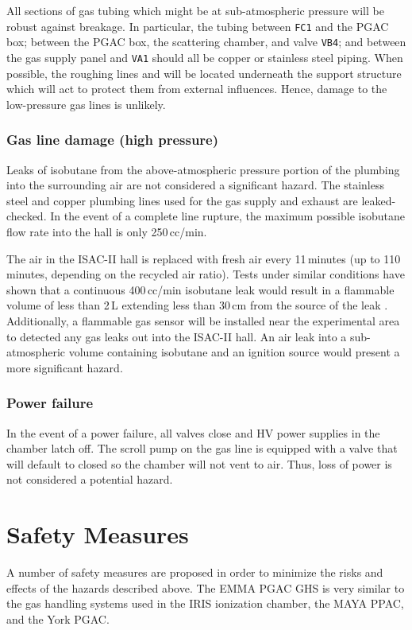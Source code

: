 All sections of gas tubing which might be at sub-atmospheric pressure will be robust against
breakage. In particular, the tubing between \texttt{FC1} and the PGAC box; between the PGAC box, the scattering chamber, and valve
\texttt{VB4}; and between the gas supply panel and \texttt{VA1} should all be copper or stainless steel piping.
When possible, the roughing lines and will be located underneath the support structure which will act to protect them from external influences. %
Hence, damage to the low-pressure gas lines is unlikely.

\subsubsection{Gas line damage (high pressure)}
Leaks of isobutane from the above-atmospheric pressure portion of the plumbing into the surrounding air are not considered a significant hazard.  The stainless steel and copper plumbing lines used for the gas supply and exhaust are leaked-checked.  In the event of a complete line rupture, the maximum possible isobutane flow rate into the hall is only 250\,cc/min.

The air in the ISAC-II hall is replaced with fresh air every 11\,minutes (up to 110 minutes, depending on the recycled air ratio).
Tests under similar conditions have shown that a continuous 400\,cc/min isobutane leak would result in a flammable volume of less than 2\,L extending less than 30\,cm from the source of the leak   \cite{Openshaw_2006}. Additionally, a flammable gas sensor will be installed near the experimental area to detected any gas
leaks out into the ISAC-II hall.  An air leak into a sub-atmospheric volume containing isobutane and an ignition source would present a more significant hazard.

\subsubsection{Power failure} In the event of a power failure, all valves close and HV power supplies in the chamber latch off. The
scroll pump on the gas line is equipped with a valve that will default to closed so the chamber will
not vent to air. Thus, loss of power is not considered a potential hazard.

\section{Safety Measures}
A number of safety measures are proposed in order to minimize the risks and effects of the hazards
described above.  The EMMA PGAC GHS is very similar to the gas handling systems used in the IRIS ionization chamber, the MAYA PPAC, and the York PGAC.
